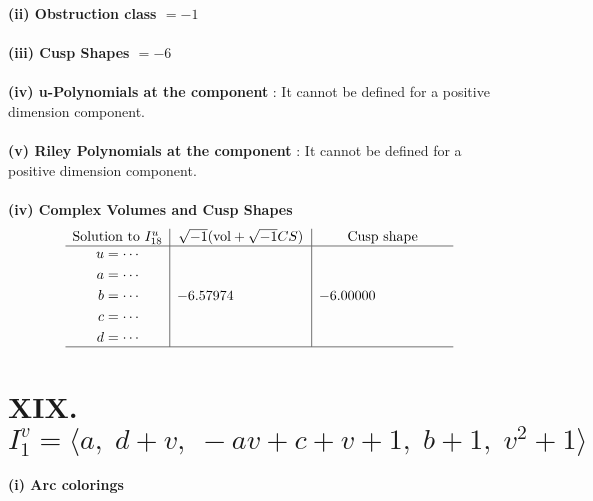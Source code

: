 \documentclass[1p]{elsarticle_modified}
\theoremstyle{definition}
\newcommand{\I}{\sqrt{-1}}
\begin{document}
\flushleft \textbf{(ii) Obstruction class $= -1$}\\~\\
\flushleft \textbf{(iii) Cusp Shapes $= -6$}\\~\\
\flushleft \textbf{(iv) u-Polynomials at the component} : It cannot be defined for a positive dimension component.\\~\\
\flushleft \textbf{(v) Riley Polynomials at the component} : It cannot be defined for a positive dimension component.\\~\\
\newpage\flushleft \textbf{(iv) Complex Volumes and Cusp Shapes}
$$\begin{array}{c|c|c} 
\text{Solution to }I^u_{18}& \I (\text{vol} + \sqrt{-1}CS) & \text{Cusp shape}\\
 \hline 
\begin{aligned}
u &= \cdots \\
a &= \cdots \\
b &= \cdots \\
c &= \cdots \\
d &= \cdots\end{aligned}
 & -6.57974\phantom{ +0.000000I} & -6.00000\phantom{ +0.000000I}\\
 \hline 
 \end{array}
$$\newpage\renewcommand{\arraystretch}{1}
\centering \section*{XIX. $I^v_{1}= \langle a,\;d+v,\;- a v+c+v+1,\;b+1,\;v^2+1 \rangle$}
\flushleft \textbf{(i) Arc colorings}\\
\end{document}
